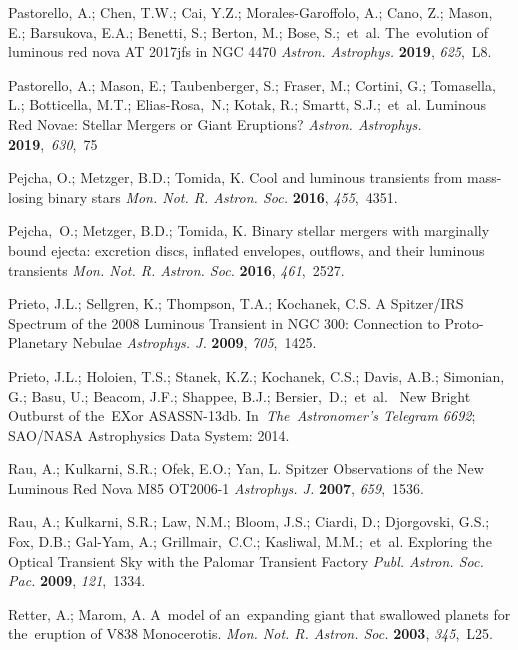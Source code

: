 \documentclass[galaxies,article,accept,moreauthors,pdftex]{mdpi}
\makeatletter
\let\jnl@style=\rmfamily
\def\ref@jnl#1{{\jnl@style#1}}%
\newcommand\apj{\ref@jnl{Astrophys. J.}}%
\newcommand\aap{\ref@jnl{Astron. Astrophys.}}%
\newcommand\mnras{\ref@jnl{Mon. Not. R. Astron. Soc.}}%
\makeatother
\begin{document}
\begin{thebibliography}{999}
 Pastorello, A.; Chen, T.W.; Cai, Y.Z.; Morales-Garoffolo, A.; Cano, Z.; Mason, E.; Barsukova, E.A.; Benetti, S.; Berton, M.; Bose, S.;~et~al. The~evolution of luminous red nova AT 2017jfs in NGC 4470 {\em \aap} \textbf{2019}, \emph{625},~L8.


 Pastorello, A.; Mason, E.; Taubenberger, S.; Fraser, M.; Cortini, G.; Tomasella, L.; Botticella, M.T.; Elias-Rosa,~N.; Kotak, R.; Smartt, S.J.;~et~al. Luminous Red Novae: Stellar Mergers or Giant Eruptions? {\em \aap} \textbf{2019},~\emph{630},~75


 Pejcha, O.; Metzger, B.D.; Tomida, K. Cool and luminous transients from mass-losing binary stars {\em \mnras} \textbf{2016}, \emph{455},~4351.


 Pejcha,~O.; Metzger, B.D.; Tomida, K.  Binary stellar mergers with marginally bound ejecta: excretion discs, inflated envelopes, outflows, and their luminous transients {\em \mnras} \textbf{2016}, \emph{461},~2527.


 Prieto, J.L.; Sellgren, K.; Thompson, T.A.; Kochanek, C.S. A Spitzer/IRS Spectrum of the 2008 Luminous Transient in NGC 300: Connection to Proto-Planetary Nebulae {\em \apj} \textbf{2009}, \emph{705},~1425.


 Prieto, J.L.; Holoien, T.S.; Stanek, K.Z.; Kochanek, C.S.; Davis, A.B.; Simonian, G.; Basu, U.; Beacom, J.F.; Shappee, B.J.; Bersier,~D.;~et~al. {\ New Bright Outburst of the~EXor ASASSN-13db}. In~{\em The~Astronomer's Telegram 6692}; SAO/NASA Astrophysics Data System: 2014.



 Rau, A.; Kulkarni, S.R.; Ofek, E.O.; Yan, L. Spitzer Observations of the New Luminous Red Nova M85 OT2006-1  {\em \apj} \textbf{2007}, \emph{659},~1536.


 Rau, A.; Kulkarni, S.R.; Law, N.M.; Bloom, J.S.; Ciardi, D.; Djorgovski, G.S.; Fox, D.B.; Gal-Yam, A.; Grillmair,~C.C.; Kasliwal, M.M.;~et~al. Exploring the Optical Transient Sky with the Palomar Transient Factory  {\em Publ. Astron. Soc. Pac.} \textbf{2009}, \emph{121},~1334.


 Retter, A.; Marom, A. A~model of an~expanding giant that swallowed planets for the~eruption of V838 Monocerotis. {\em \mnras} \textbf{2003}, \emph{345},~L25.



\end{thebibliography}
\end{document}
